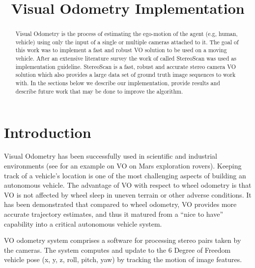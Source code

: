 \documentclass[10pt]{article}         %
\title{Visual Odometry Implementation}
\begin{document}
\maketitle

\begin{abstract}
Visual Odometry is the process of estimating the ego-motion of the agent (e.g, human, vehicle) using only the input of a single or multiple cameras attached to it. The goal of this work was to implement a fast and robust VO solution to be used on a moving vehicle. After an extensive literature survey the work of \cite{Geiger2011IV} called StereoScan was used as implementation guideline.  StereoScan is a fast, robust and accurate stereo camera VO solution which also provides a large data set of ground truth image sequences to work with.  In the sections below we describe our implementation, provide results and describe future work that may be done to improve the algorithm.
\end{abstract}
\section{Introduction}

Visual Odometry has been successfully used in scientific and industrial environments (see \cite{Maimone07twoyears} for an example on VO on Mars exploration rovers). Keeping track of a vehicle's location is one of the most challenging aspects of building an autonomous vehicle.  The advantage of VO with respect to wheel odometry is that VO is not affected by wheel sleep in uneven terrain or other adverse conditions.  It has been demonstrated that compared to wheel odometry, VO provides more accurate trajectory estimates, and thus it matured from a ``nice to have'' capability into a critical autonomous vehicle system.

VO odometry system comprises a software for processing stereo pairs taken by the cameras.  The system computes and update to the 6 Degree of Freedom vehicle pose (x, y, z, roll, pitch, yaw) by tracking the motion of image features. 
\end{document}
